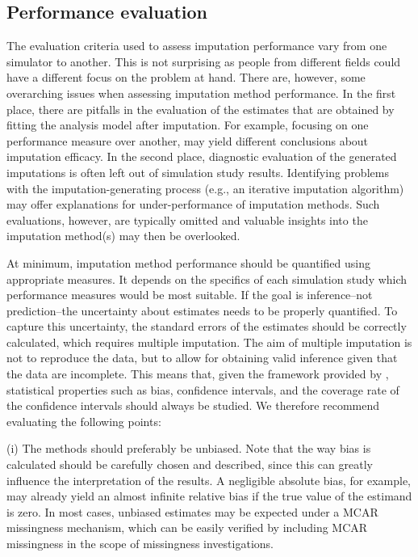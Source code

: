 \documentclass[bimj,fleqn]{w-art}
\begin{document}
\subsection{Performance evaluation}
The evaluation criteria used to assess imputation performance vary from one simulator to another. This is not surprising as people from different fields could have a different focus on the problem at hand. There are, however, some overarching issues when assessing imputation method performance. In the first place, there are pitfalls in the evaluation of the estimates that are obtained by fitting the analysis model after imputation. For example, focusing on one performance measure over another, may yield different conclusions about imputation efficacy. In the second place, diagnostic evaluation of the generated imputations is often left out of simulation study results. Identifying problems with the imputation-generating process (e.g., an iterative imputation algorithm) may offer explanations for under-performance of imputation methods. Such evaluations, however, are typically omitted and valuable insights into the imputation method(s) may then be overlooked. 

At minimum, imputation method performance should be quantified using appropriate measures. It depends on the specifics of each simulation study which performance measures would be most suitable. If the goal is inference--not prediction--the uncertainty about estimates needs to be properly quantified. To capture this uncertainty, the standard errors of the estimates should be correctly calculated, which requires multiple imputation. The aim of multiple imputation is not to reproduce the data, but to allow for obtaining valid inference given that the data are incomplete. This means that, given the framework provided by \citet{rubi87}, statistical properties such as bias, confidence intervals, and the coverage rate of the confidence intervals should always be studied. We therefore recommend evaluating the following points:

(i) The methods should preferably be unbiased. Note that the way bias is calculated should be carefully chosen and described, since this can greatly influence the interpretation of the results. A negligible absolute bias, for example, may already yield an almost infinite relative bias if the true value of the estimand is zero. In most cases, unbiased estimates may be expected under a MCAR missingness mechanism, which can be easily verified by including MCAR missingness in the scope of missingness investigations.
\end{document}
